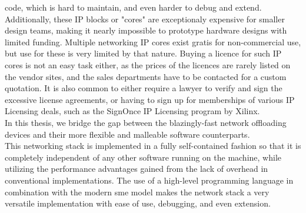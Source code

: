 code, which is hard to maintain, and even harder to debug and
extend\cite{opencores_mission}.  Additionally, these IP blocks or
"cores" are exceptionaly expensive for smaller design teams, making
it nearly impossible to prototype hardware designs with limited
funding\cite{opencores_mission}. Multiple networking IP cores exist gratis for
non-commercial use, but use for these is very limited by that nature.
Buying a licence for such IP cores is not an easy task either, as the
prices of the licences are rarely listed on the vendor sites, and the
sales departments have to be contacted for a custom quotation. It is
also common to either require a lawyer to verify and sign the excessive
license agreements, or having to sign up for memberships of various
IP Licensing deals, such as the SignOnce IP Licensing program by
Xilinx\cite{xilinx_signonce}.\\

In this thesis, we bridge the gap between the blazingly-fast network offloading
devices and their more flexible and malleable software counterparts.\\
This networking stack is implemented in a fully self-contained fashion so that
it is completely independent of any other software running on the machine, while
utilizing the performance advantages gained from the lack of overhead in
conventional implementations.
The use of a high-level programming language in combination with the modern
\gls{sme} model makes the network stack a very versatile
implementation with ease of use, debugging, and even extension.


